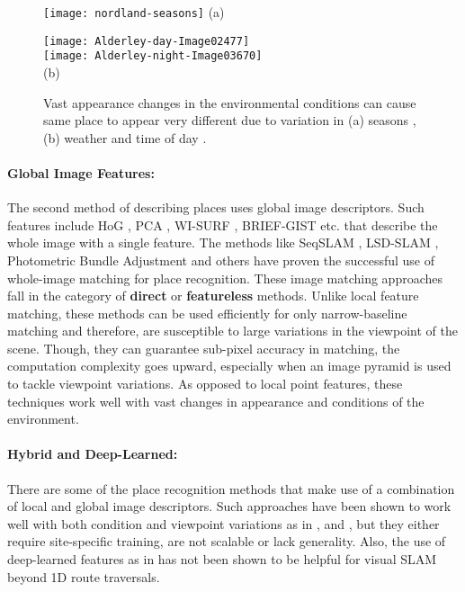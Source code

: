 \documentclass{article}
\begin{document}
\begin{figure}
 \centering
 \begin{minipage}{0.4\textwidth}
\raggedright
\texttt{[image: nordland-seasons]}
\centering(a)
 \end{minipage}
 \hspace{1cm}
\begin{minipage}{0.4\textwidth}
\raggedleft
  \texttt{[image: Alderley-day-Image02477]}\\
  \texttt{[image: Alderley-night-Image03670]}\\
  \centering(b)
\end{minipage}
\caption{Vast appearance changes in the environmental conditions can cause same place to appear very different due to variation in (a) seasons \cite{lopez2017appearance}, (b) weather and time of day \cite{Milford2012}.}
\label{fig:conditionVariations}
\end{figure}


\paragraph{Global Image Features:} The second method of describing places uses global image descriptors. Such features include HoG \cite{Naseer2014}, PCA \cite{Krose2001}, WI-SURF \cite{Badino2012}, BRIEF-GIST \cite{Sunderhauf2011} etc. that describe the whole image with a single feature. The methods like SeqSLAM \cite{Milford2012}, LSD-SLAM \cite{Engel2014lsd}, Photometric Bundle Adjustment \cite{alismail2016photometric} and others \cite{Naseer2014,McManus2015} have proven the successful use of whole-image matching for place recognition. These image matching approaches fall in the category of \textbf{direct} or \textbf{featureless} methods. Unlike local feature matching, these methods can be used efficiently for only narrow-baseline matching and therefore, are susceptible to large variations in the viewpoint of the scene. Though, they can guarantee sub-pixel accuracy in matching, the computation complexity goes upward, especially when an image pyramid is used to tackle viewpoint variations. As opposed to local point features, these techniques work well with vast changes in appearance and conditions of the environment. 

\paragraph{Hybrid and Deep-Learned:} There are some of the place recognition methods that make use of a combination of local and global image descriptors. Such approaches have been shown to work well with both condition and viewpoint variations as in \cite{McManus2014}, \cite{Milford2008} and \cite{Niko2015}, but they either require site-specific training, are not scalable or lack generality. Also, the use of deep-learned features as in \cite{chen2017deep,chen2014convolutional} has not been shown to be helpful for visual SLAM beyond 1D route traversals.
\end{document}
